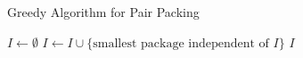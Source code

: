 \begin{frame}{Greedy Algorithm for Pair Packing}


\begin{algorithm}[H]
\begin{algorithmic}[1]

\STATE $I \gets \emptyset$
\STATE $I \gets I \cup \{\text{smallest package independent of $I$}\}$
\ENDWHILE
\RETURN $I$


\end{algorithmic}
\caption{Greedy Algorithm}
\end{algorithm}


\end{frame}